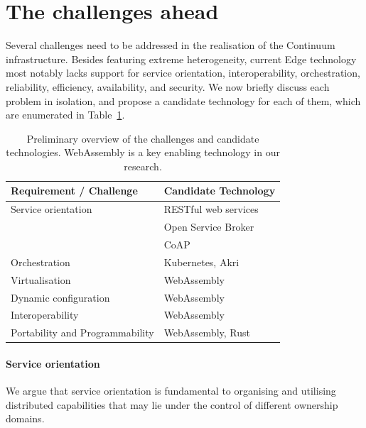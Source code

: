 \section{The challenges ahead}
\label{sec:challenges}

Several challenges need to be addressed in the realisation of the Continuum infrastructure. 
Besides featuring extreme heterogeneity, current Edge technology most notably lacks support for service orientation, interoperability, orchestration, reliability, efficiency, availability, and security. 
We now briefly discuss each problem in isolation, and propose a candidate technology for each of them, which are enumerated in Table~\ref{fig:challenges-technologies}.

\begin{table}
  \caption{Preliminary overview of the challenges and candidate technologies. WebAssembly is a key enabling technology in our research.}  \label{fig:challenges-technologies}
  \begin{tabular*}{\textwidth}{ | l | l }
   \toprule
    \textbf{Requirement / Challenge} & \textbf{Candidate    Technology} \\
   \midrule
    Service orientation & RESTful web services \\
    & Open Service Broker \\
    & CoAP \\
    \midrule
    Orchestration & Kubernetes, Akri \\
    Virtualisation & WebAssembly \\
    Dynamic configuration & WebAssembly \\
    Interoperability & WebAssembly \\
    Portability and Programmability & WebAssembly, Rust \\
   \bottomrule
  \end{tabular*}
\end{table}

\paragraph{Service orientation}\label{p:service-orientation}
We argue that service orientation is fundamental to organising and utilising distributed capabilities that may lie under the control of different ownership domains. 

